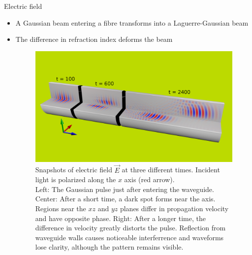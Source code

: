 \documentclass[8pt]{beamer}
\newlength{\wideitemsep}
\let\olditem\item
\renewcommand{\item}{\setlength{\itemsep}{\wideitemsep}\olditem}
\newcommand{\blockpadding}{
  \rule[-0.6ex]{0pt}{2.5ex}
}
\begin{document}
\begin{columns}[t]
 \begin{column}{0.596\textwidth}
  \begin{block}{\blockpadding Electric field}
  \begin{itemize}
   \item A Gaussian beam entering a fibre transforms into a Laguerre-Gaussian beam
   \item The difference in refraction index deforms the beam
   \vspace{.86ex}
\begin{figure}[h]
\centering
 \includegraphics[width=.825\textwidth,clip,trim=0mm 50mm 0mm 80mm]{./render_t}
 \caption{Snapshots of electric field $\vec E$ at three different times. Incident light is polarized along the $x$ axis (red arrow). \\{\color{dark} Left:} The Gaussian pulse just after entering the waveguide. {\color{dark} Center:} After a short time, a dark spot forms near the axis. Regions near the $xz$ and $yz$ planes differ in propagation velocity and have opposite phase. {\color{dark} Right:} After a longer time, the difference in velocity greatly distorts the pulse. Reflection from waveguide walls causes noticeable interferrence and waveforms lose clarity, although the pattern remains visible. }
\end{figure}
\end{itemize}


\end{block}
\end{column}
\end{columns}
\end{document}
